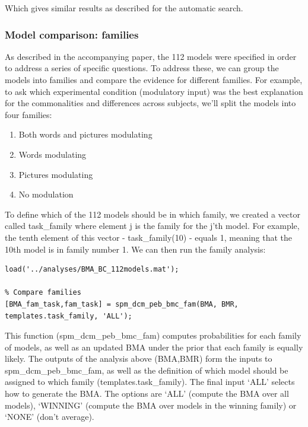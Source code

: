 \documentclass{article}
\begin{document}
Which gives similar results as described for the automatic search.

\subsubsection{Model comparison: families}
As described in the accompanying paper, the 112 models were specified in order to address a series of specific questions. To address these, we can group the models into families and compare the evidence for different families. For example, to ask which experimental condition (modulatory input) was the best explanation for the commonalities and differences across subjects, we'll split the models into four families:

\begin{enumerate}
    \item Both words and pictures modulating
    \item Words modulating
    \item Pictures modulating
    \item No modulation
\end{enumerate}

To define which of the 112 models should be in which family, we created a vector called task\_family where element j is the family for the j'th model. For example, the tenth element of this vector - task\_family(10) - equals 1, meaning that the 10th model is in family number 1. We can then run the family analysis:

\begin{lstlisting}[style=Matlab-editor,caption=Family comparison]
% Load the result from the comparison of 112 reduced models
load('../analyses/BMA_BC_112models.mat');

% Compare families
[BMA_fam_task,fam_task] = spm_dcm_peb_bmc_fam(BMA, BMR, templates.task_family, 'ALL');
\end{lstlisting}

This function (spm\_dcm\_peb\_bmc\_fam) computes probabilities for each family of models, as well as an updated BMA under the prior that each family is equally likely. The outputs of the analysis above (BMA,BMR) form the inputs to spm\_dcm\_peb\_bmc\_fam, as well as the definition of which model should be assigned to which family (templates.task\_family). The final input `ALL' selects how to generate the BMA. The options are `ALL' (compute the BMA over all models), `WINNING' (compute the BMA over models in the winning family) or `NONE' (don't average). 
\end{document}
